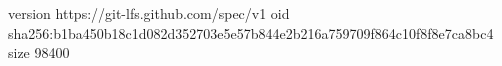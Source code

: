 version https://git-lfs.github.com/spec/v1
oid sha256:b1ba450b18c1d082d352703e5e57b844e2b216a759709f864c10f8f8e7ca8bc4
size 98400
